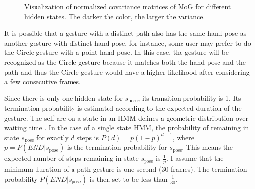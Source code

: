 \begin{figure}[tbh]
\centering
{}
\caption{Visualization of normalized covariance matrices of MoG for different
hidden states. The darker the color, the larger the variance.}
\label{fig:covariance}
\end{figure}

It is possible that a gesture with a distinct path also has the same hand pose
as another gesture with distinct hand pose, for instance, some user may prefer
to do the Circle gesture with a point hand pose. In this case, the gesture
will be recognized as the Circle gesture because it matches both the hand
pose and the path and thus the Circle gesture would have a higher likelihood
after considering a few consecutive frames.

Since there is only one hidden state for $s_{\text{pose}}$, its transition
probability is 1. Its termination probability is estimated according to the
expected duration of the gesture. The self-arc on a state in an HMM defines a 
geometric distribution over waiting time \cite{murphy02}. In the case of a
single state HMM, the probability of remaining in state $s_{\text{pose}}$ for
exactly $d$ steps is $P(d) = p(1-p)^{d - 1}$, where $p = P(END|s_\text{pose})$
is the termination probability for $s_{\text{pose}}$. This means the expected
number of steps remaining in state $s_{\text{pose}}$ is $\frac{1}{p}$. I assume
that the minimum duration of a path gesture is one
second (30 frames). The termination probability $P(END|s_\text{pose})$ is then set to
be less than $\frac{1}{30}$.

